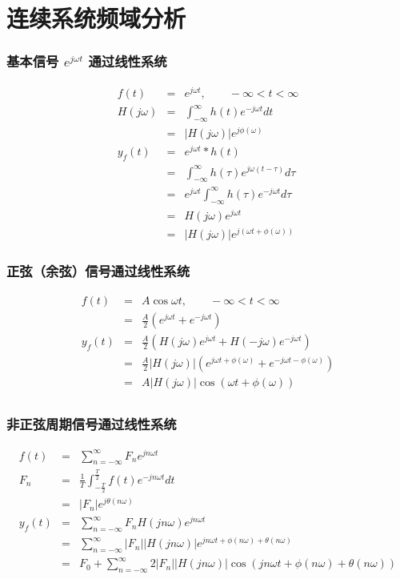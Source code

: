 \documentclass{beamer}
\begin{document}
\section{连续系统频域分析}
\label{sec-7}
\begin{frame}
\frametitle{基本信号 $e^{j\omega t}$ 通过线性系统}
\label{sec-7-1}

\begin{eqnarray*}
f(t) & =& e^{j\omega t},\qquad -\infty < t < \infty \\
H(j\omega) &=& \int_{-\infty}^{\infty}h(t)e^{-j\omega t}dt \\
           &=& |H(j\omega)|e^{j\phi(\omega)} \\
y_f(t) &=& e^{j\omega t}*h(t) \\
       &=& \int_{-\infty}^{\infty}h(\tau)e^{j\omega(t-\tau)}d\tau \\
       &=& e^{j\omega t}\int_{-\infty}^{\infty}h(\tau)e^{-j\omega t}d\tau \\
       &=& H(j\omega)e^{j\omega t} \\
       &=& |H(j\omega)|e^{j(\omega t+\phi(\omega))}
\end{eqnarray*}
\end{frame}
\begin{frame}
\frametitle{正弦（余弦）信号通过线性系统}
\label{sec-7-2}

\begin{eqnarray*}
f(t) & =& A\cos\omega t , \qquad  -\infty<t<\infty \\
     &=&\frac{A}{2}(e^{j\omega t}+e^{-j\omega t}) \\
y_f(t) &=& \frac{A}{2}(H(j\omega)e^{j\omega t}+H(-j\omega)e^{-j\omega t}) \\
       &=& \frac{A}{2}|H(j\omega)|(e^{j\omega t+\phi(\omega)}+e^{-j\omega t-\phi(\omega)}) \\
       &=& A|H(j\omega)|\cos(\omega t+\phi(\omega)) \\
\end{eqnarray*}
\end{frame}
\begin{frame}
\frametitle{非正弦周期信号通过线性系统}
\label{sec-7-3}

\begin{eqnarray*}
f(t) &=& \sum_{n=-\infty}^{\infty}F_n e^{jn\omega t} \\
F_n &=& \frac{1}{T}\int_{-\frac{T}{2}}^{\frac{T}{2}}f(t)e^{-jn\omega t}dt \\
    &=& |F_n|e^{j\theta(n\omega)} \\
y_f(t) &=& \sum_{n=-\infty}^{\infty}F_nH(jn\omega)e^{jn\omega t} \\
       &=& \sum_{n=-\infty}^{\infty}|F_n||H(jn\omega)|e^{jn\omega t+\phi(n\omega)+\theta(n\omega)} \\
       &=& F_0+ \sum_{n=-\infty}^{\infty}2|F_n||H(jn\omega)|\cos(jn\omega t+\phi(n\omega)+\theta(n\omega))
\end{eqnarray*}
\end{frame}
\end{document}
